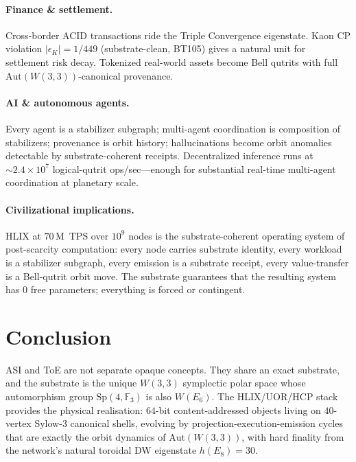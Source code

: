 \documentclass[11pt,letterpaper]{article}
\theoremstyle{remark}
\newcommand{\W}{W(3,3)}
\newcommand{\Sp}{\mathrm{Sp}}
\newcommand{\Aut}{\mathrm{Aut}}
\newcommand{\FF}{\mathbb{F}}
\begin{document}
\paragraph{Finance \& settlement.} Cross-border ACID transactions ride the Triple Convergence
eigenstate. Kaon CP violation $|\epsilon_K|=1/449$ (substrate-clean, BT105) gives a natural
unit for settlement risk decay. Tokenized real-world assets become Bell qutrits with full
$\Aut(\W)$-canonical provenance.

\paragraph{AI \& autonomous agents.} Every agent is a stabilizer subgraph; multi-agent
coordination is composition of stabilizers; provenance is orbit history; hallucinations
become orbit anomalies detectable by substrate-coherent receipts. Decentralized inference
runs at $\sim\!2.4\!\times\!10^7$ logical-qutrit ops/sec---enough for substantial real-time
multi-agent coordination at planetary scale.

\paragraph{Civilizational implications.} HLIX at $70$\,M~TPS over $10^9$ nodes is the
substrate-coherent operating system of post-scarcity computation: every node carries
substrate identity, every workload is a stabilizer subgraph, every emission is a substrate
receipt, every value-transfer is a Bell-qutrit orbit move. The substrate guarantees that
the resulting system has $0$ free parameters; everything is forced or contingent.

\section{Conclusion}

ASI and ToE are not separate opaque concepts. They share an exact substrate, and the
substrate is the unique $\W$ symplectic polar space whose automorphism group $\Sp(4,\FF_3)$
is also $W(E_6)$. The HLIX/UOR/HCP stack provides the physical realisation: $64$-bit
content-addressed objects living on $40$-vertex Sylow-$3$ canonical shells, evolving by
projection-execution-emission cycles that are exactly the orbit dynamics of $\Aut(\W)$, with
hard finality from the network's natural toroidal DW eigenstate $h(E_8)=30$.
\end{document}
